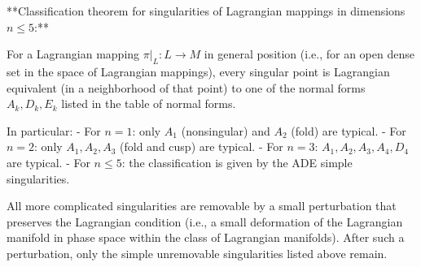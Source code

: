 **Classification theorem for singularities of Lagrangian mappings in dimensions $n \leq 5$:**

For a Lagrangian mapping $\pi|_L: L \to M$ in general position (i.e., for an open dense set in the space of Lagrangian mappings), every singular point is Lagrangian equivalent (in a neighborhood of that point) to one of the normal forms $A_k, D_k, E_k$ listed in the table of normal forms.

In particular:
- For $n = 1$: only $A_1$ (nonsingular) and $A_2$ (fold) are typical.
- For $n = 2$: only $A_1, A_2, A_3$ (fold and cusp) are typical.
- For $n = 3$: $A_1, A_2, A_3, A_4, D_4$ are typical.
- For $n \leq 5$: the classification is given by the ADE simple singularities.

All more complicated singularities are removable by a small perturbation that preserves the Lagrangian condition (i.e., a small deformation of the Lagrangian manifold in phase space within the class of Lagrangian manifolds). After such a perturbation, only the simple unremovable singularities listed above remain.
